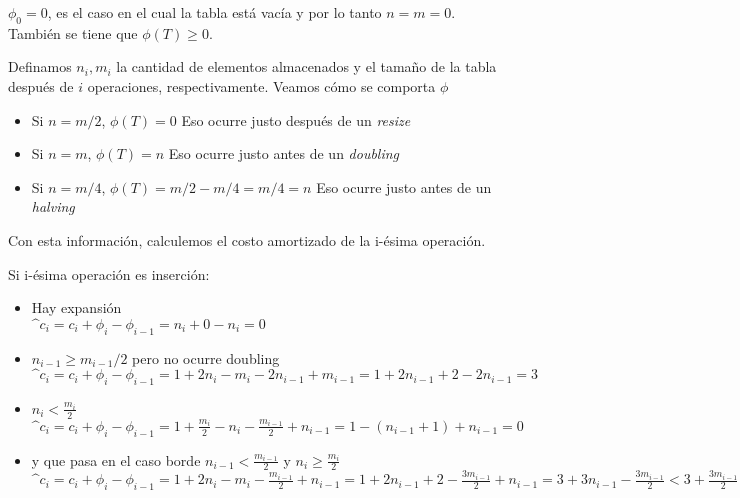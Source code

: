 \documentclass[dcc,uchile]{fcfmcourse}
\begin{document}
\begin{problems}
\begin{enumerate}[a)]
\begin{itemize}
        $\phi_0 = 0$, es el caso en el cual la tabla está vacía y por lo tanto $n=m=0$. También se tiene que $\phi(T)\ge 0$.
        
        Definamos $n_i, m_i$ la cantidad de elementos almacenados y el tamaño de la tabla después de $i$ operaciones, respectivamente.
        Veamos cómo se comporta $\phi$  
        \begin{itemize}
            \item Si $n=m/2$, $\phi(T)=0$ Eso ocurre justo después de un \textit{resize}
            \item Si $n=m$, $\phi(T)=n$ Eso ocurre justo antes de un \textit{doubling}
            \item Si $n=m/4$, $\phi(T)=m/2-m/4=m/4=n$ Eso ocurre justo antes de un \textit{halving}
        \end{itemize}
        
        Con esta información, calculemos el costo amortizado de la i-ésima operación.
        
        Si i-ésima operación es inserción:
        \begin{itemize}
            \item Hay expansión \\ $\^c_i=c_i + \phi_i - \phi_{i-1} = n_i + 0 - n_i = 0$
            \item $n_{i-1}\ge m_{i-1}/2$ pero no ocurre doubling \\ 
             $\^c_i=c_i + \phi_i - \phi_{i-1} = 1+2n_i-m_i-2n_{i-1}+m_{i-1}=1+2n_{i-1}+2-2n_{i-1}=3$
             \item $n_{i}< \frac{m_{i}}{2}$ \\
             $\^c_i=c_i + \phi_i - \phi_{i-1} = 1+\frac{m_{i}}{2}-n_i-\frac{m_{i-1}}{2}+n_{i-1}=1-(n_{i-1}+1)+n_{i-1}=0$
             \item y que pasa en el caso borde $n_{i-1} < \frac{m_{i-1}}{2}$ y $n_{i}\ge\frac{m_{i}}{2}$ \\
              $\^c_i=c_i + \phi_i - \phi_{i-1} = 1 + 2n_i - m_i - \frac{m_{i-1}}{2} + n_{i-1}= 1+2n_{i-1}+2-\frac{3m_{i-1}}{2} + n_{i-1} = 3+3n_{i-1} - \frac{3m_{i-1}}{2} < 3 + \frac{3m_{i-1}}{2} - \frac{3m_{i-1}}{2} = 3$
        \end{itemize}
        

\end{itemize}
\end{enumerate}
\end{problems}
\end{document}
